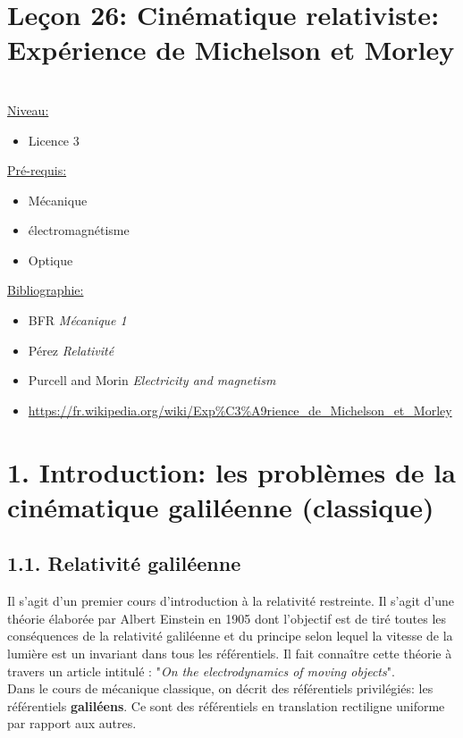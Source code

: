 \documentclass[french, a4paper, 10pt, twocolumn, landscape]{article}
\begin{document}
\section*{Leçon 26: Cinématique relativiste: Expérience de Michelson et Morley}
\hrulefill\\
	\underline{Niveau:}
	\begin{itemize}
		\item Licence 3
	\end{itemize}
	\underline{Pré-requis:} 
	\begin{itemize}
		\item Mécanique
		\item électromagnétisme
		\item Optique
	\end{itemize}
	\underline{Bibliographie:}
	\begin{itemize}
		\item BFR \textit{Mécanique 1}
		\item Pérez \textit{Relativité}
		\item Purcell and Morin \textit{Electricity and magnetism}
		\item \url{https://fr.wikipedia.org/wiki/Exp%C3%A9rience_de_Michelson_et_Morley}
	\end{itemize}
\hrulefill

\section*{1. Introduction: les problèmes de la cinématique galiléenne (classique)}

\subsection*{1.1. Relativité galiléenne}

Il s'agit d'un premier cours d'introduction à la relativité restreinte. Il s'agit d'une théorie élaborée par Albert Einstein en 1905 dont l'objectif est de tiré toutes les conséquences de la relativité galiléenne et du principe selon lequel la vitesse de la lumière est un invariant dans tous les référentiels. Il fait connaître cette théorie à travers un article intitulé : "\textit{On the electrodynamics of moving objects}".\\[.5cm]

Dans le cours de mécanique classique, on décrit des référentiels privilégiés: les référentiels \textbf{galiléens}. Ce sont des référentiels en translation rectiligne uniforme par rapport aux autres. 
\end{document}
